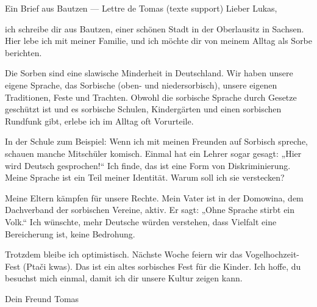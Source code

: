 \documentclass[11pt]{article}
\begin{document}
\begin{textebox}{Ein Brief aus Bautzen — Lettre de Tomas (texte support)}
Lieber Lukas,

ich schreibe dir aus Bautzen, einer schönen Stadt in der Oberlausitz in Sachsen. Hier lebe ich mit meiner Familie, und ich möchte dir von meinem Alltag als Sorbe berichten.

Die Sorben sind eine slawische Minderheit in Deutschland. Wir haben unsere eigene Sprache, das Sorbische (oben- und niedersorbisch), unsere eigenen Traditionen, Feste und Trachten. Obwohl die sorbische Sprache durch Gesetze geschützt ist und es sorbische Schulen, Kindergärten und einen sorbischen Rundfunk gibt, erlebe ich im Alltag oft Vorurteile.

In der Schule zum Beispiel: Wenn ich mit meinen Freunden auf Sorbisch spreche, schauen manche Mitschüler komisch. Einmal hat ein Lehrer sogar gesagt: „Hier wird Deutsch gesprochen!“ Ich finde, das ist eine Form von Diskriminierung. Meine Sprache ist ein Teil meiner Identität. Warum soll ich sie verstecken?

Meine Eltern kämpfen für unsere Rechte. Mein Vater ist in der Domowina, dem Dachverband der sorbischen Vereine, aktiv. Er sagt: „Ohne Sprache stirbt ein Volk.“ Ich wünschte, mehr Deutsche würden verstehen, dass Vielfalt eine Bereicherung ist, keine Bedrohung.

Trotzdem bleibe ich optimistisch. Nächste Woche feiern wir das Vogelhochzeit-Fest (Ptači kwas). Das ist ein altes sorbisches Fest für die Kinder. Ich hoffe, du besuchst mich einmal, damit ich dir unsere Kultur zeigen kann.

Dein Freund
Tomas
\end{textebox}
\end{document}
